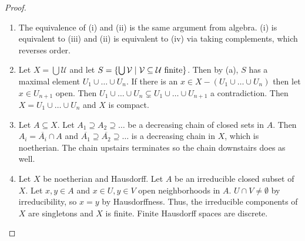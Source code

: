 \begin{proof}
    \begin{enumerate}[label = (\alph*)]
        \item The equivalence of (i) and (ii) is the same argument from algebra. (i) is equivalent to (iii) and (ii) is equivalent to (iv) via taking complements, which reverses order.
        
        \item Let $X = \bigcup \mathcal U$ and let $S = {\left\{\bigcup \mathcal V \mid \mathcal V \subseteq \mathcal U \text{ finite}\right\}}$. Then by (a), $S$ has a maximal element $U_1 \cup \dots \cup U_n$. If there is an $x \in X - (U_1 \cup \dots \cup U_n)$ then let $x \in U_{n + 1}$ open. Then $U_1 \cup \dots \cup U_n \subsetneq U_1 \cup \dots \cup U_{n + 1}$ a contradiction. Then $X = U_1 \cup \dots \cup U_n$ and $X$ is compact.
        
        \item Let $A \subseteq X$. Let $A_1 \supseteq A_2 \supseteq \dots$ be a decreasing chain of closed sets in $A$. Then $A_i = \overline{A_i} \cap A$ and $\overline{A_1} \supseteq \overline{A_2} \supseteq \dots$ is a decreasing chain in $X$, which is noetherian. The chain upstairs terminates so the chain downstairs does as well.
        
        \item Let $X$ be noetherian and Hausdorff. Let $A$ be an irreducible closed subset of $X$. Let $x, y \in A$ and $x \in U, y \in V$ open neighborhoods in $A$. $U \cap V \neq \emptyset$ by irreducibility, so $x = y$ by Hausdorffness. Thus, the irreducible components of $X$ are singletons and $X$ is finite. Finite Hausdorff spaces are discrete.
    \end{enumerate}
\end{proof}